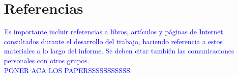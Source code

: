 \documentclass[a4paper]{article}
\begin{document}
\section{Referencias}
\textcolor{blue}{Es importante incluir referencias a libros, art\'iculos y p\'aginas de Internet consultados
durante el desarrollo del trabajo, haciendo referencia a estos materiales a lo largo del
informe. Se deben citar tambi\'en las comunicaciones personales con otros grupos.\\
PONER ACA LOS PAPERSSSSSSSSSSS\\
}
\\
\end{document}
